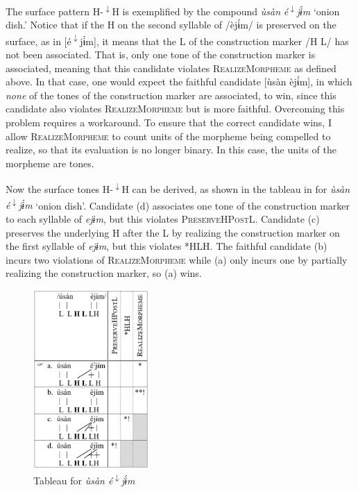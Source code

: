 \documentclass[output=paper]{langscibook}
\begin{document}
The surface pattern H-\textsuperscript{$\downarrow$}H is exemplified by the compound \textit{ùsàn} \textit{é\textsuperscript{$\downarrow$}}\textit{jɨ́m} ‘onion dish.’ Notice that if the H on the second syllable of /èjɨ́m/ is preserved on the surface, as in [é\textsuperscript{$\downarrow$}jɨ́m], it means that the L of the construction marker /H L/ has not been associated. That is, only one tone of the construction marker is associated, meaning that this candidate violates \textsc{RealizeMorpheme} as defined above. In that case, one would expect the faithful candidate [ùsàn èjɨ́m], in which \textit{none} of the tones of the construction marker are associated, to win, since this candidate also violates \textsc{RealizeMorpheme} but is more faithful. Overcoming this problem requires a workaround. To ensure that the correct candidate wins, I allow \textsc{RealizeMorpheme} to count units of the morpheme being compelled to realize, so that its evaluation is no longer binary. In this case, the units of the morpheme are tones. 

Now the surface tones H-\textsuperscript{$\downarrow$}H can be derived, as shown in the tableau in  for \textit{ùsàn} \textit{é\textsuperscript{$\downarrow$}}\textit{jɨ́m} ‘onion dish’. Candidate (d) associates one tone of the construction marker to each syllable of \textit{ejɨm}, but this violates \textsc{PreserveHPostL}. Candidate (c) preserves the underlying H after the L by realizing the construction marker on the first syllable of \textit{ejɨm}, but this violates *HLH. The faithful candidate (b) incurs two violations of \textsc{RealizeMorpheme} while (a) only incurs one by partially realizing the construction marker, so (a) wins.\largerpage

\begin{figure}[h]
\includegraphics[width=44mm]{figures/glewwe-img7.png}
\caption{Tableau for \textit{ùsàn é}\textup{\textsuperscript{$\downarrow$}}\textit{jɨ́m}}
\label{fig:glewwe:8}
\end{figure}
\end{document}
